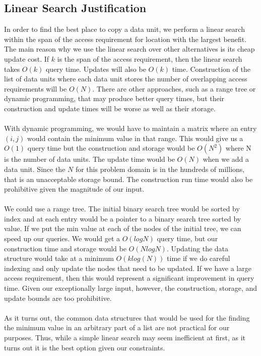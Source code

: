 \begin{appendix}

\section{Linear Search Justification}

In order to find the best place to copy a data unit, we perform a linear search
within the span of the access requirement for location with the largest
benefit.  The main reason why we use the linear search over other alternatives
is its cheap update cost.  If $k$ is the span of the access requirement, then
the linear search takes $O(k)$ query time. Updates will also be $O(k)$ time.
Construction of the
list of data units where each data unit stores the number of overlapping access
requirements will be $O(N)$. There are other approaches, such as a range tree
or dynamic programming, that may produce better query times, but their
construction and update times will be worse as well as their storage. \\
\\
With dynamic programming, we would have to maintain a matrix where an entry
$(i,j)$ would contain the minimum value in that range. This would give us a
$O(1)$ query time but the construction and storage would be $O(N^2)$ where N is
the number of data units. The update time would be $O(N)$ when we add a data
unit. Since the $N$ for this problem domain is in the hundreds of millions,
that is an unacceptable storage bound. The construction run time would also be
prohibitive given the magnitude of our input. \\
\\
We could use a range tree. The initial binary search tree would be sorted by
index and at each entry would be a pointer to a binary search tree sorted by
value. If we put the min value at each of the nodes of the initial tree, we can
speed up our queries. We would get a $O(log N)$ query time, but our
construction time and storage would be $O(N log N)$. Updating the data
structure would take at a minimum $O(k log(N))$ time if we do careful indexing
and only update the nodes that need to be updated. If we have a large access
requirement, then this would represent a significant improvement in query time.
Given our exceptionally large input, however, the construction, storage, and
update bounds are too prohibitive.  \\
\\
As it turns out, the common data structures that would be used for the finding the minimum value in an arbitrary part of a list are not practical for our purposes. Thus, while a simple linear search may seem inefficient at first, as it turns out it is the best option given our constraints. 

\end{appendix}
